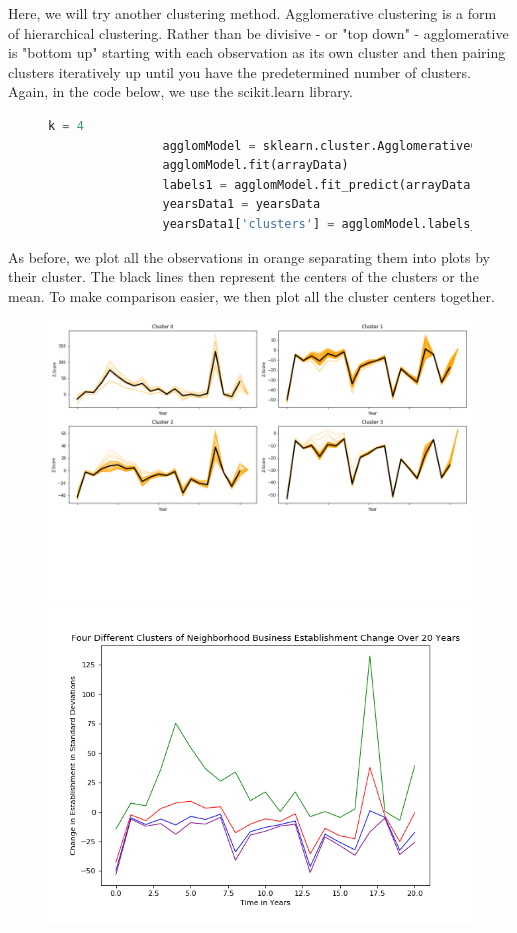 \documentclass[letter, 11pt]{article} %
\begin{document}
		Here, we will try another clustering method. Agglomerative clustering is a form of hierarchical clustering. Rather than be divisive - or "top down" - agglomerative is "bottom up" starting with each observation as its own cluster and then pairing clusters iteratively up until you have the predetermined number of clusters. Again, in the code below, we use the scikit.learn library.

		\begin{figure}[H]
			\centering
			\begin{lstlisting}[language=python]
				k = 4
				agglomModel = sklearn.cluster.AgglomerativeClustering(n_clusters=k).fit(arrayData)
				agglomModel.fit(arrayData)
				labels1 = agglomModel.fit_predict(arrayData)
				yearsData1 = yearsData
				yearsData1['clusters'] = agglomModel.labels_
			\end{lstlisting}			
		\end{figure}
		
		\noindent As before, we plot all the observations in orange separating them into plots by their cluster. The black lines then represent the centers of the clusters or the mean. To make comparison easier, we then plot all the cluster centers together.

		\begin{figure}[H]
			\centering
			\includegraphics[scale=.25]{clusters1.png}
			\includegraphics[scale=.5]{means2.png}
		\end{figure}	
		
\end{document}
